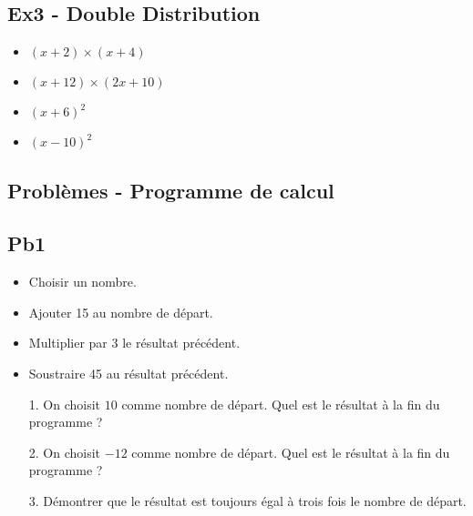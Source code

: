 \subsection*{Ex3 - Double Distribution}

\begin{multicols}{2}
  \begin{itemize}[label={$\bullet$}]
  \item $(x + 2) \times ( x + 4 ) $\\
  \item $(x + 12) \times ( 2x + 10 ) $\\
  \item $(x + 6)^2 $\\
  \item $(x - 10)^2 $\\
\end{itemize} \end{multicols}

\subsection*{Problèmes - Programme de calcul}

\begin{multicols}{2}

  \subsection*{Pb1}

  \begin{itemize}[label={$\bullet$}]
  \item Choisir un nombre.
  \item Ajouter 15 au nombre de départ. 
  \item Multiplier par 3 le résultat précédent.
  \item Soustraire 45 au résultat précédent.
\end{itemize} \columnbreak

\begin{enumerate}
  \item[1.] On choisit $10$ comme nombre de départ. \newline Quel est le résultat à la fin du programme ?
  \item[2.] On choisit $-12$ comme nombre de départ. \newline Quel est le résultat à la fin du programme ?
  \item[3.] Démontrer que le résultat est toujours égal à trois fois le nombre de départ. 
\end{enumerate}
\end{multicols}

